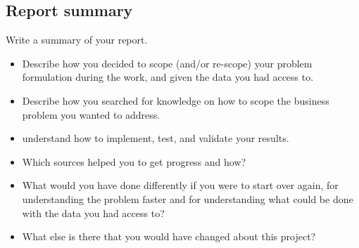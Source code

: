 \subsection{Report summary }
Write a summary of your report.
\begin{itemize}
  \item Describe how you decided to scope (and/or re-scope) your problem formulation during the work, and given the data you had access to.
  \item Describe how you searched for knowledge on how to scope the business problem you wanted to address.
  \item understand how to implement, test, and validate your results.
  \item Which sources helped you to get progress and how?
  \item What would you have done differently if you were to start over again, for understanding the problem faster and for understanding what could be done with the data you had access to?
  \item What else is there that you would have changed about this project?
\end{itemize}
